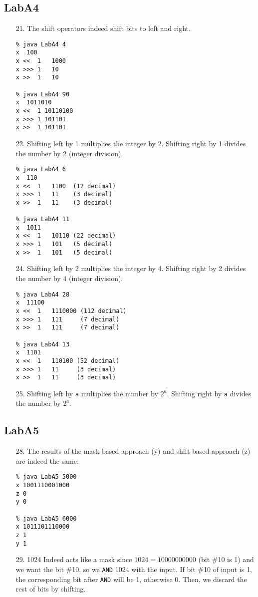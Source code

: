 \documentclass{article}
\begin{document}
\subsection{LabA4}
\begin{enumerate}
\item[21. ] The shift operators indeed shift bits to left and right.
\begin{verbatim}
% java LabA4 4
x  100
x <<  1   1000
x >>> 1   10
x >>  1   10

% java LabA4 90
x  1011010
x <<  1 10110100
x >>> 1 101101
x >>  1 101101
\end{verbatim}

\item[22. ] Shifting left by 1 multiplies the integer by 2. Shifting right by 1 divides the number by 2 (integer division).
\begin{verbatim}
% java LabA4 6
x  110
x <<  1   1100  (12 decimal)
x >>> 1   11    (3 decimal)
x >>  1   11    (3 decimal)

% java LabA4 11
x  1011
x <<  1   10110 (22 decimal)
x >>> 1   101   (5 decimal)
x >>  1   101   (5 decimal)
\end{verbatim}

\item[24. ] Shifting left by 2 multiplies the integer by 4. Shifting right by 2 divides the number by 4 (integer division).
\begin{verbatim}
% java LabA4 28
x  11100
x <<  1   1110000 (112 decimal)
x >>> 1   111     (7 decimal)
x >>  1   111     (7 decimal)

% java LabA4 13
x  1101
x <<  1   110100 (52 decimal)
x >>> 1   11     (3 decimal)
x >>  1   11     (3 decimal)
\end{verbatim}

\item[25. ] Shifting left by \verb$a$ multiplies the number by $2^a$. Shifting right by \verb$a$ divides the number by $2^a$.

\end{enumerate}

\subsection{LabA5}
\begin{enumerate}
\item[28. ] The results of the mask-based approach (y) and shift-based approach (z) are indeed the same:
\begin{verbatim}
% java LabA5 5000
x 1001110001000
z 0
y 0

% java LabA5 6000
x 1011101110000
z 1
y 1
\end{verbatim}
\item[29. ] 1024 Indeed acts like a mask since $1024 = 10000000000$ (bit \#10 is 1) and we want the bit \#10, so we \verb$AND$ 1024 with the input. If bit \#10 of input is 1, the corresponding bit after \verb$AND$ will be 1, otherwise 0. Then, we discard the rest of bits by shifting.
\end{enumerate}
\end{document}
